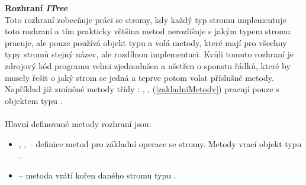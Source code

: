 \documentclass[
  biblatex=false,
  font=serif,
  glossaries=false,
  tables=false,
  theorems=false,
  index
]{kidiplom}
\begin{document}
\smallskip
\noindent \textbf{Rozhraní \textit{ITree}} \label{ITree}\\
\indent Toto rozhraní zobecňuje práci se stromy, kdy každý typ stromu implementuje toto rozhraní a tím prakticky většina metod nerozlišuje s jakým typem stromu pracuje, ale pouze používá objekt typu  a volá metody, které mají pro všechny typy stromů stejný název, ale rozdílnou implementaci. Kvůli tomuto rozhraní je zdrojový kód programu velmi zjednodušen a ušetřen o spoustu řádků, které by musely řešit o jaký strom se jedná a teprve potom volat příslušné metody. Například již zmíněné metody třídy : ,  ,  (\ref{zakladniMetody}) pracují pouze s objektem typu .\\\\
Hlavní definované metody rozhraní jsou:

\begin{itemize}
\item {},  ,  -- definice metod pro základní operace se stromy. Metody vrací objekt typu .

\item {} -- metoda vrátí kořen daného stromu typu  .
\end{itemize}
\end{document}
